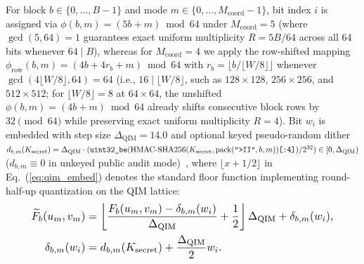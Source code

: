 \documentclass[conference,10pt]{IEEEtran}
\begin{document}
For block $b \in \{0, \dots, B-1\}$ and mode $m \in \{0, \dots, M_{\text{coord}}-1\}$, bit index $i$ is assigned via $\phi(b,m) = (5b + m) \bmod 64$ under $M_{\text{coord}} = 5$ (where $\gcd(5,64)=1$ guarantees exact uniform multiplicity $R = 5B/64$ across all 64 bits whenever $64 \mid B$), whereas for $M_{\text{coord}} = 4$ we apply the row-shifted mapping $\phi_{\text{row}}(b,m) = (4b + 4 r_b + m) \bmod 64$ with $r_b = \lfloor b / \lfloor W/8 \rfloor \rfloor$ whenever $\gcd(4\lfloor W/8 \rfloor, 64) = 64$ (i.e., $16 \mid \lfloor W/8 \rfloor$, such as $128\times 128$, $256\times 256$, and $512\times 512$; for $\lfloor W/8 \rfloor = 8$ at $64\times 64$, the unshifted $\phi(b,m) = (4b + m) \bmod 64$ already shifts consecutive block rows by $32 \pmod{64}$ while preserving exact uniform multiplicity $R = 4$). Bit $w_i$ is embedded with step size $\Delta_{\text{QIM}} = 14.0$ and optional keyed pseudo-random dither $d_{b,m}(K_{\text{secret}}) = \Delta_{\text{QIM}} \cdot (\texttt{uint32\_be}(\allowbreak\mathrm{HMAC\text{-}SHA256}(\allowbreak K_{\text{secret}},\allowbreak \mathrm{pack}(\text{\texttt{">II"}}, b, m))\allowbreak\texttt{[:4]}) / 2^{32}) \in [0, \Delta_{\text{QIM}})$ ($d_{b,m} \equiv 0$ in unkeyed public audit mode)~\cite{chen2001}, where $\lfloor x + 1/2 \rfloor$ in Eq.~(\ref{eq:qim_embed}) denotes the standard floor function implementing round-half-up quantization on the QIM lattice:
\begin{equation}
\label{eq:qim_embed}
\resizebox{0.89\columnwidth}{!}{$\displaystyle
\begin{aligned}
\widetilde{F}_b(u_m, v_m) &= \left\lfloor \frac{F_b(u_m, v_m) - \delta_{b,m}(w_i)}{\Delta_{\text{QIM}}} + \frac{1}{2} \right\rfloor \Delta_{\text{QIM}} + \delta_{b,m}(w_i), \\
\delta_{b,m}(w_i) &= d_{b,m}(K_{\text{secret}}) + \frac{\Delta_{\text{QIM}}}{2} w_i.
\end{aligned}
$}
\end{equation}
\end{document}
